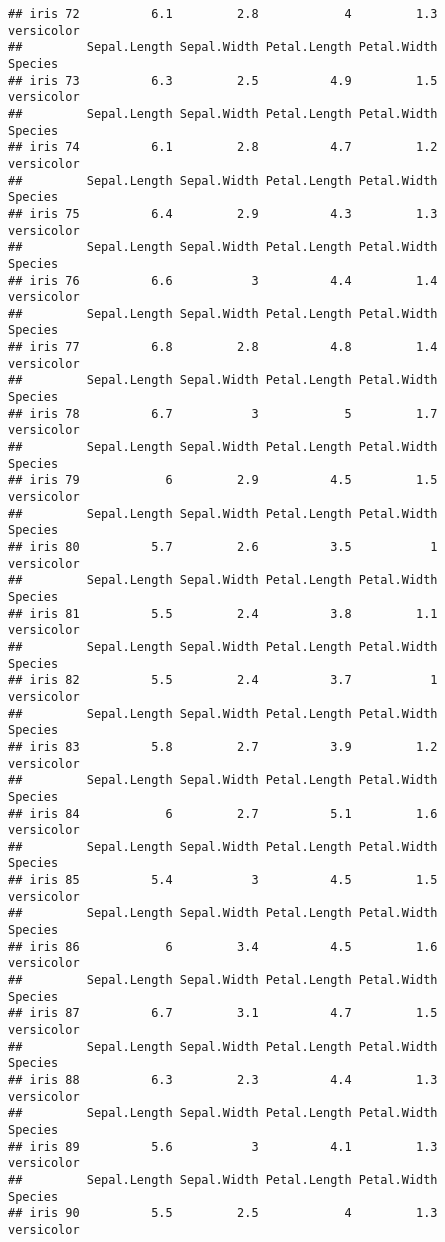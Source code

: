 \documentclass[
]{article}
\begin{document}
\begin{verbatim}
## iris 72          6.1         2.8            4         1.3 versicolor
##         Sepal.Length Sepal.Width Petal.Length Petal.Width    Species
## iris 73          6.3         2.5          4.9         1.5 versicolor
##         Sepal.Length Sepal.Width Petal.Length Petal.Width    Species
## iris 74          6.1         2.8          4.7         1.2 versicolor
##         Sepal.Length Sepal.Width Petal.Length Petal.Width    Species
## iris 75          6.4         2.9          4.3         1.3 versicolor
##         Sepal.Length Sepal.Width Petal.Length Petal.Width    Species
## iris 76          6.6           3          4.4         1.4 versicolor
##         Sepal.Length Sepal.Width Petal.Length Petal.Width    Species
## iris 77          6.8         2.8          4.8         1.4 versicolor
##         Sepal.Length Sepal.Width Petal.Length Petal.Width    Species
## iris 78          6.7           3            5         1.7 versicolor
##         Sepal.Length Sepal.Width Petal.Length Petal.Width    Species
## iris 79            6         2.9          4.5         1.5 versicolor
##         Sepal.Length Sepal.Width Petal.Length Petal.Width    Species
## iris 80          5.7         2.6          3.5           1 versicolor
##         Sepal.Length Sepal.Width Petal.Length Petal.Width    Species
## iris 81          5.5         2.4          3.8         1.1 versicolor
##         Sepal.Length Sepal.Width Petal.Length Petal.Width    Species
## iris 82          5.5         2.4          3.7           1 versicolor
##         Sepal.Length Sepal.Width Petal.Length Petal.Width    Species
## iris 83          5.8         2.7          3.9         1.2 versicolor
##         Sepal.Length Sepal.Width Petal.Length Petal.Width    Species
## iris 84            6         2.7          5.1         1.6 versicolor
##         Sepal.Length Sepal.Width Petal.Length Petal.Width    Species
## iris 85          5.4           3          4.5         1.5 versicolor
##         Sepal.Length Sepal.Width Petal.Length Petal.Width    Species
## iris 86            6         3.4          4.5         1.6 versicolor
##         Sepal.Length Sepal.Width Petal.Length Petal.Width    Species
## iris 87          6.7         3.1          4.7         1.5 versicolor
##         Sepal.Length Sepal.Width Petal.Length Petal.Width    Species
## iris 88          6.3         2.3          4.4         1.3 versicolor
##         Sepal.Length Sepal.Width Petal.Length Petal.Width    Species
## iris 89          5.6           3          4.1         1.3 versicolor
##         Sepal.Length Sepal.Width Petal.Length Petal.Width    Species
## iris 90          5.5         2.5            4         1.3 versicolor

\end{verbatim}
\end{document}
